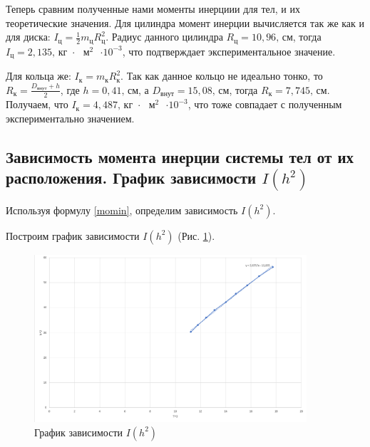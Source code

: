 	Теперь сравним полученные нами моменты инерциии для тел, и их теоретические значения. Для цилиндра момент инерции вычисляется так же как и для диска: $I_\text{ц} = \frac{1}{2}m_\text{ц}R_\text{ц}^2$. Радиус данного цилиндра $R_\text{ц} = 10,96\text{, см}$, тогда $I_\text{ц} = 2,135 \text{,  кг $\cdot$ $\text{м}^2$ $\cdot 10^{-3}$}$, что подтверждает экспериментальное значение.
	
	Для кольца же: $I_\text{к} = m_\text{к}R_\text{к}^2$. Так как данное кольцо не идеально тонко, то $R_\text{к} = \frac{D_\text{внут} + h}{2}$, где $h = 0,41 \text{, см}$, а $D_\text{внут} = 15,08\text{, см}$, тогда $R_\text{к} = 7,745 \text{, см}$. Получаем, что $I_\text{к} = 4,487\text{,  кг $\cdot$ $\text{м}^2$ $\cdot 10^{-3}$}$, что тоже совпадает с полученным экспериментально значением.
	
	\subsection{Зависимость момента инерции системы тел от их расположения. График зависимости $I(h^2)$}
	
	
	Используя формулу \ref{momin}, определим зависимость $I(h^2)$.
	
Построим график зависимости $ I(h^{2}) $ (Рис. \ref{ris:grafik}).
	\bigskip\bigskip\bigskip\bigskip\bigskip
	

	\begin{figure}[!h]
		\begin{center}
			\includegraphics[width=0.9\textwidth]{1.2.3 graph}
			\caption{График зависимости $ I(h^2) $}
			\label{ris:grafik}
		\end{center}
	\end{figure}
	
